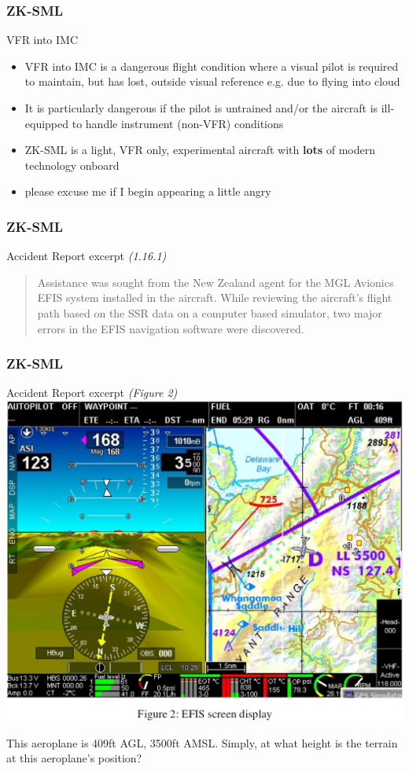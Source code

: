 \begin{frame}
\frametitle{ZK-SML}
\begin{block}{VFR into IMC}
\begin{itemize}
\item<1-> VFR into IMC is a dangerous flight condition where a visual pilot is required to maintain, but has lost, outside visual reference e.g. due to flying into cloud
\item<2-> It is particularly dangerous if the pilot is untrained and/or the aircraft is ill-equipped to handle instrument (non-VFR) conditions
\item<3-> ZK-SML is a light, VFR only, experimental aircraft with \textbf{lots} of modern technology onboard
\item<4-> \tiny{please excuse me if I begin appearing a little angry}
\end{itemize}
\end{block}
\end{frame}

\begin{frame}
\frametitle{ZK-SML}
\begin{block}{Accident Report excerpt \tiny{\emph{(1.16.1)}}}
\begin{quote}
Assistance was sought from the New Zealand agent for the MGL Avionics EFIS system installed in the aircraft.  While reviewing the aircraft's flight path based on the SSR data on a computer based simulator, two major errors in the EFIS navigation software were discovered. 
\end{quote}
\end{block}
\end{frame}

\begin{frame}
\frametitle{ZK-SML}
\begin{block}{Accident Report excerpt \tiny{\emph{(Figure 2)}}}
\includegraphics[height=0.7\textheight]{image/zk-sml-map.png}
\end{block}
\tiny{This aeroplane is 409ft AGL, 3500ft AMSL. Simply, at what height is the terrain at this aeroplane's position?}
\end{frame}

